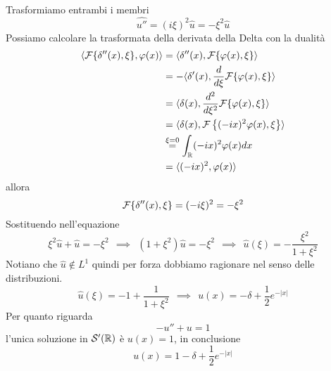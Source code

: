 Trasformiamo entrambi i membri
\begin{equation*}
\widehat{u''} = (i\xi)^{2}\hat{u} = - \xi^{2}\hat{u}
\end{equation*}
Possiamo calcolare la trasformata della derivata della Delta con la dualità
\begin{align*}
\langle \mathcal{F} \{\delta ''(x), \xi \}, \varphi (x) \rangle & = \langle \delta ''(x), \mathcal{F} \{\varphi (x), \xi \} \rangle \\
 & = - \langle \delta '(x), \frac{d}{d\xi}\mathcal{F} \{\varphi (x), \xi \} \rangle \\
 & = \langle \delta (x), \frac{d^{2}}{d\xi^{2}}\mathcal{F} \{\varphi (x), \xi \} \rangle \\
 & = \langle \delta (x), \mathcal{F} \left\{(- ix)^{2} \varphi (x), \xi \right\} \rangle \\
 & \overset{\xi = 0}{=}\int_{\mathbb{R}}(- ix)^{2} \varphi (x) dx\\
 & = \langle (- ix)^{2}, \varphi (x) \rangle
\end{align*}
allora
\begin{equation*}
\mathcal{F} \{\delta ''(x), \xi \} = (- i\xi)^{2} = - \xi^{2}
\end{equation*}
Sostituendo nell'equazione
\begin{equation*}
\xi^{2}\hat{u} + \hat{u} = - \xi^{2} \ \ \implies \ \ \left(1 + \xi^{2}\right)\hat{u} = - \xi^{2} \ \ \implies \ \ \hat{u}(\xi) = - \frac{\xi^{2}}{1 + \xi^{2}}
\end{equation*}
Notiano che $\hat{u} \notin L^{1}$ quindi per forza dobbiamo ragionare nel senso delle distribuzioni.
\begin{equation*}
\hat{u}(\xi) = - 1 + \frac{1}{1 + \xi^{2}} \ \ \implies \ \ u(x) = - \delta + \frac{1}{2} e^{- | x|}
\end{equation*}
Per quanto riguarda
\begin{equation*}
- u'' + u = 1
\end{equation*}
l'unica soluzione in $\mathcal{S} '(\mathbb{R})$ è $u(x) = 1$, in conclusione
\begin{equation*}
u(x) = 1 - \delta + \frac{1}{2} e^{- | x|}
\end{equation*}
\Soluzione

